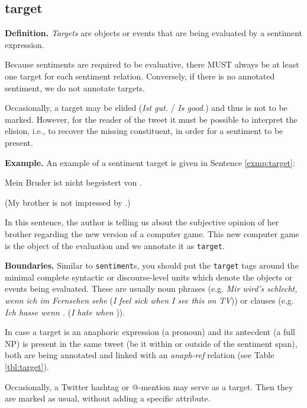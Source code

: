 \subsection{target}
\noindent\textbf{Definition.} \emph{Targets} are objects or events
that are being evaluated by a sentiment expression.

\noindent{} Because sentiments are required to be evaluative, there
MUST always be at least one target for each sentiment relation.
Conversely, if there is no annotated sentiment, we do not annotate
targets.

Occasionally, a target may be elided (\emph{Ist gut.} / \emph{Is
  good.})  and thus is not to be marked.  However, for the reader of
the tweet it must be possible to interpret the elision, i.e., to
recover the missing constituent, in order for a sentiment to be
present.

\noindent\textbf{Example.} An example of a sentiment target is given in
Sentence \ref{exmp:target}:
\begin{example}
Mein Bruder ist nicht begeistert von .

(My brother is not impressed by .)\label{exmp:target}
\end{example}
\noindent In this sentence, the author is telling us about the subjective
opinion of her brother regarding the new version of a computer game.  This new
computer game is the object of the evaluation and we annotate it as
\texttt{target}.

\noindent\textbf{Boundaries.} Similar to \texttt{sentiment}s, you should put
the \texttt{target} tags around the minimal complete syntactic or
discourse-level units which denote the objects or events being evaluated.
These are usually noun phrases (e.g. \textit{Mir wird's schlecht, wenn ich
   im Fernsehen sehe} (\textit{I feel sick when I see
  this  on TV})) or clauses (e.g. \textit{Ich hasse wenn
  .} (\textit{I hate when
  })).

In case a target is an anaphoric expression (a pronoun) and its
antecdent (a full NP) is present in the same tweet (be it within or
outside of the sentiment span), both are being annotated and linked
with an \emph{anaph-ref} relation (see Table \ref{tbl:target}).

Occasionally, a Twitter hashtag or @-mention may serve as a target.
Then they are marked as usual, without adding a specific attribute.

